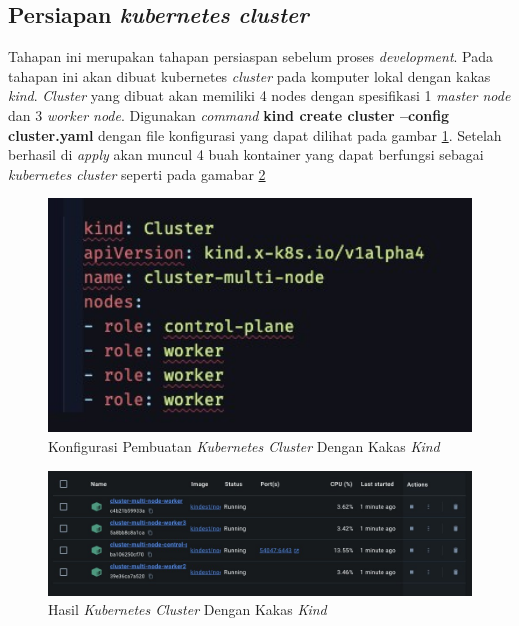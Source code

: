 \subsection{Persiapan \textit{kubernetes cluster}}

Tahapan ini merupakan tahapan persiaspan sebelum proses \textit{development}. Pada tahapan ini akan dibuat kubernetes \textit{cluster} pada komputer lokal dengan kakas \textit{kind}. \textit{Cluster} yang dibuat akan memiliki 4 nodes dengan spesifikasi 1 \textit{master node} dan 3 \textit{worker node}. Digunakan \textit{command} \textbf{kind create cluster --config cluster.yaml} dengan file konfigurasi yang dapat dilihat pada gambar \ref{fig:konfigurasi-pembuatan-cluster}. Setelah berhasil di \textit{apply} akan muncul 4 buah kontainer yang dapat berfungsi sebagai \textit{kubernetes cluster} seperti pada gamabar \ref{fig:hasil-cluster-kind}

\begin{figure}[ht]
  \centering
  \includegraphics[width=1\textwidth]{resources/appendix/pembuatan-cluster.jpg}
  \caption{Konfigurasi Pembuatan \textit{Kubernetes Cluster} Dengan Kakas \textit{Kind}}
  \label{fig:konfigurasi-pembuatan-cluster}
\end{figure}

\begin{figure}[ht]
  \centering
  \includegraphics[width=1\textwidth]{resources/chapter-4/cluster-kind.jpg}
  \caption{Hasil \textit{Kubernetes Cluster} Dengan Kakas \textit{Kind}}
  \label{fig:hasil-cluster-kind}
\end{figure}

\pagebreak